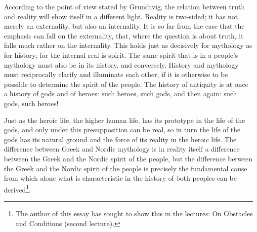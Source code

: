 \documentclass[12pt,a4paper,openany]{book}
\newcommand{\opage}[1]{\marginnote{\footnotesize\textit{[#1]}}}
\begin{document}
According to the point of view stated by Grundtvig, the relation
between truth and reality will show itself in a
different light. Reality is two-sided; it has not
merely an externality, but also an internality. It is
so far from the case that the emphasis can fall on the externality,
that, where the question is about truth,
it falls much rather on the internality. This holds
just as decisively for mythology as for history; for
the internal real is spirit. The same spirit
that is in a people's mythology must also be in its history,
and conversely. History and mythology must reciprocally
clarify and illuminate each other, if it is otherwise to
be possible to determine the spirit of the people. The history of antiquity
is at once a history of gods and of heroes:
such heroes, such gods, and then again:
such gods, such heroes!

Just as the heroic life, the higher human life, has its prototype
in the life of the gods, and only under this presupposition
can be real, so in turn the life of the gods
has its natural ground and the force of its reality in the heroic life.
The difference between Greek and Nordic
mythology is in reality itself a difference between
the Greek and the Nordic spirit of the people, but the difference
between the Greek and the Nordic spirit of the people is
\setcounter{footnote}{0}%
\opage{432}precisely the fundamental cause from which alone what is characteristic in
the history of both peoples can be derived\footnote[1]{The author of this essay has sought to show this in the lectures: On Obstacles and Conditions (second lecture).}.
\end{document}
